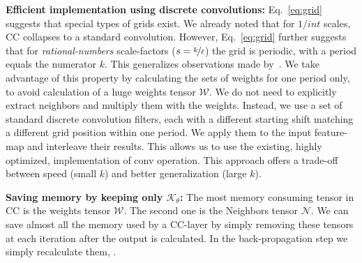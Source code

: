 \textbf{Efficient implementation using discrete convolutions:} Eq.~\ref{eq:grid} 
suggests that special types of grids exist. We already noted that for $1/int$ scales, CC collapses to a standard convolution. However, Eq.~\ref{eq:grid}  further suggests that for \emph{rational-numbers}  scale-factors ($s=\nicefrac{k}{\ell}$) the grid is periodic, with a period equals the numerator $k$. This generalizes observations made by~\cite{romano2016raisr,freedman2011image}. We take advantage of this property by calculating the sets of weights for one period only, to avoid calculation of a huge weights tensor $\mathcal{W}$. We do not need to explicitly extract neighbors and multiply them with the weights. Instead, we use a set of standard discrete convolution filters, each with a different starting shift matching a different grid position within one period. We apply them to the input feature-map and interleave their results. This allows us to use the existing, highly optimized, implementation of conv operation. This approach offers a trade-off between speed (small $k$) and better generalization (large $k$). 



\textbf{Saving memory by keeping only $\mathcal{K}_\theta$:} The most memory consuming tensor in CC is the weights tensor $\mathcal{W}$. The second one is the Neighbors tensor $\mathcal{N}$. We can save almost all the memory used by a CC-layer by simply removing these tensors at each iteration after the output is calculated. In the back-propagation step we simply recalculate them, .

